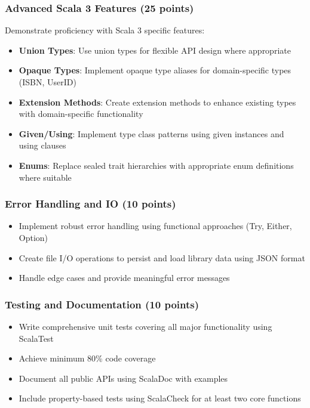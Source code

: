\documentclass[11pt,a4paper]{article}
\begin{document}
\subsubsection{Advanced Scala 3 Features (25 points)}

Demonstrate proficiency with Scala 3 specific features:

\begin{itemize}
    \item \textbf{Union Types}: Use union types for flexible API design where appropriate
    \item \textbf{Opaque Types}: Implement opaque type aliases for domain-specific types (ISBN, UserID)
    \item \textbf{Extension Methods}: Create extension methods to enhance existing types with domain-specific functionality
    \item \textbf{Given/Using}: Implement type class patterns using given instances and using clauses
    \item \textbf{Enums}: Replace sealed trait hierarchies with appropriate enum definitions where suitable
\end{itemize}

\subsubsection{Error Handling and IO (10 points)}

\begin{itemize}
    \item Implement robust error handling using functional approaches (Try, Either, Option)
    \item Create file I/O operations to persist and load library data using JSON format
    \item Handle edge cases and provide meaningful error messages
\end{itemize}

\subsubsection{Testing and Documentation (10 points)}

\begin{itemize}
    \item Write comprehensive unit tests covering all major functionality using ScalaTest
    \item Achieve minimum 80\% code coverage
    \item Document all public APIs using ScalaDoc with examples
    \item Include property-based tests using ScalaCheck for at least two core functions
\end{itemize}
\end{document}
